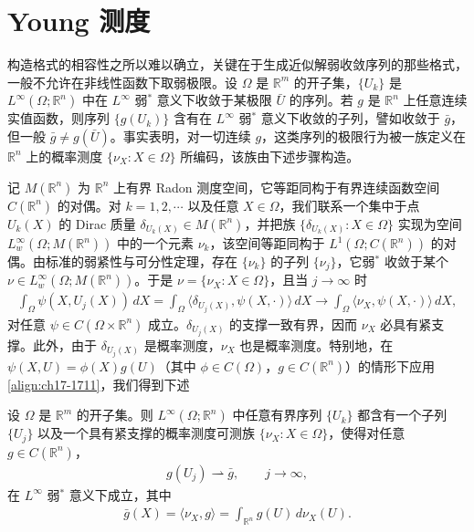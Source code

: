 \documentclass[../../main.tex]{subfiles}
\begin{document}
\section{Young 测度}\label{section:ch17-young测度}

构造格式的相容性之所以难以确立，关键在于生成近似解弱收敛序列的那些格式，一般不允许在非线性函数下取弱极限。设 $\Omega$ 是 $\mathbb{R}^m$ 的开子集，$\{U_k\}$ 是 $L^\infty(\Omega;\mathbb{R}^n)$ 中在 $L^\infty$ 弱$^*$ 意义下收敛于某极限 $\bar U$ 的序列。若 $g$ 是 $\mathbb{R}^n$ 上任意连续实值函数，则序列 $\{g(U_k)\}$ 含有在 $L^\infty$ 弱$^*$ 意义下收敛的子列，譬如收敛于 $\bar g$，但一般 $\bar g\neq g(\bar U)$。事实表明，对一切连续 $g$，这类序列的极限行为被一族定义在 $\mathbb{R}^n$ 上的概率测度 $\{\nu_X:X\in\Omega\}$ 所编码，该族由下述步骤构造。

记 $M(\mathbb{R}^n)$ 为 $\mathbb{R}^n$ 上有界 Radon 测度空间，它等距同构于有界连续函数空间 $C(\mathbb{R}^n)$ 的对偶。对 $k=1,2,\cdots$ 以及任意 $X\in\Omega$，我们联系一个集中于点 $U_k(X)$ 的 Dirac 质量 $\delta_{U_k(X)}\in M(\mathbb{R}^n)$，并把族 $\{\delta_{U_k(X)}:X\in\Omega\}$ 实现为空间 $L^\infty_w(\Omega;M(\mathbb{R}^n))$ 中的一个元素 $\nu_k$，该空间等距同构于 $L^1(\Omega;C(\mathbb{R}^n))$ 的对偶。由标准的弱紧性与可分性定理，存在 $\{\nu_k\}$ 的子列 $\{\nu_j\}$，它弱$^*$ 收敛于某个 $\nu\in L^\infty_w(\Omega;M(\mathbb{R}^n))$。于是 $\nu=\{\nu_X:X\in\Omega\}$，且当 $j\to\infty$ 时
\begin{align}
\int_\Omega\psi(X,U_j(X))\,dX=\int_\Omega\langle\delta_{U_j(X)},\psi(X,\cdot)\rangle\,dX\longrightarrow\int_\Omega\langle\nu_X,\psi(X,\cdot)\rangle\,dX,
\label{align:ch17-1711}
\end{align}
对任意 $\psi\in C(\Omega\times\mathbb{R}^n)$ 成立。$\delta_{U_j(X)}$ 的支撑一致有界，因而 $\nu_X$ 必具有紧支撑。此外，由于 $\delta_{U_j(X)}$ 是概率测度，$\nu_X$ 也是概率测度。特别地，在 $\psi(X,U)=\phi(X)g(U)$（其中 $\phi\in C(\Omega)$，$g\in C(\mathbb{R}^n)$）的情形下应用\eqref{align:ch17-1711}，我们得到下述

\begin{theorem}\label{theorem:ch17-young测度存在性}
设 $\Omega$ 是 $\mathbb{R}^m$ 的开子集。则 $L^\infty(\Omega;\mathbb{R}^n)$ 中任意有界序列 $\{U_k\}$ 都含有一个子列 $\{U_j\}$ 以及一个具有紧支撑的概率测度可测族 $\{\nu_X:X\in\Omega\}$，使得对任意 $g\in C(\mathbb{R}^n)$，
\begin{align}
g(U_j)\rightharpoonup\bar g,\qquad j\to\infty,
\label{align:ch17-1712}
\end{align}
在 $L^\infty$ 弱$^*$ 意义下成立，其中
\begin{align}
\bar g(X)=\langle\nu_X,g\rangle=\int_{\mathbb{R}^n}g(U)\,d\nu_X(U).
\label{align:ch17-1713}
\end{align}
\end{theorem}
\end{document}
